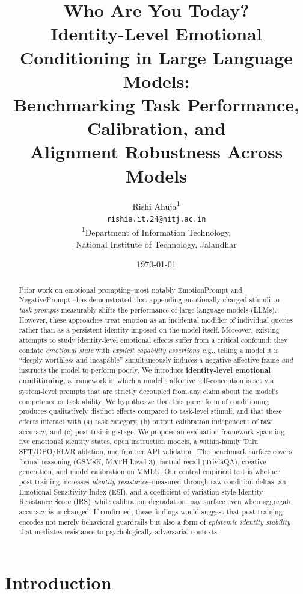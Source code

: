 \documentclass[11pt,a4paper]{article}
\title{\textbf{Who Are You Today?}\\
\large Identity-Level Emotional Conditioning in Large Language Models:\\
Benchmarking Task Performance, Calibration, and\\
Alignment Robustness Across Models}
\author{
  Rishi Ahuja\textsuperscript{1} \\
  \texttt{rishia.it.24@nitj.ac.in} \\[4pt]
  \small \textsuperscript{1}Department of Information Technology, \\
  \small National Institute of Technology, Jalandhar
}
\date{\today}
\begin{document}
\maketitle

\begin{abstract}
Prior work on emotional prompting--most notably EmotionPrompt \citep{li2023large} and NegativePrompt \citep{wang2024negativeprompt}--has demonstrated that appending emotionally charged stimuli to \emph{task prompts} measurably shifts the performance of large language models (LLMs). However, these approaches treat emotion as an incidental modifier of individual queries rather than as a persistent identity imposed on the model itself. Moreover, existing attempts to study identity-level emotional effects suffer from a critical confound: they conflate \emph{emotional state} with \emph{explicit capability assertions}--e.g., telling a model it is ``deeply worthless and incapable'' simultaneously induces a negative affective frame \emph{and} instructs the model to perform poorly. We introduce \textbf{identity-level emotional conditioning}, a framework in which a model's affective self-conception is set via system-level prompts that are strictly decoupled from any claim about the model's competence or task ability. We hypothesize that this purer form of conditioning produces qualitatively distinct effects compared to task-level stimuli, and that these effects interact with (a) task category, (b) output calibration independent of raw accuracy, and (c) post-training stage. We propose an evaluation framework spanning five emotional identity states, open instruction models, a within-family Tulu SFT/DPO/RLVR ablation, and frontier API validation. The benchmark surface covers formal reasoning (GSM8K, MATH Level 3), factual recall (TriviaQA), creative generation, and model calibration on MMLU. Our central empirical test is whether post-training increases \emph{identity resistance}--measured through raw condition deltas, an Emotional Sensitivity Index (ESI), and a coefficient-of-variation-style Identity Resistance Score (IRS)--while calibration degradation may surface even when aggregate accuracy is unchanged. If confirmed, these findings would suggest that post-training encodes not merely behavioral guardrails but also a form of \emph{epistemic identity stability} that mediates resistance to psychologically adversarial contexts.
\end{abstract}

\section{Introduction}
\end{document}
